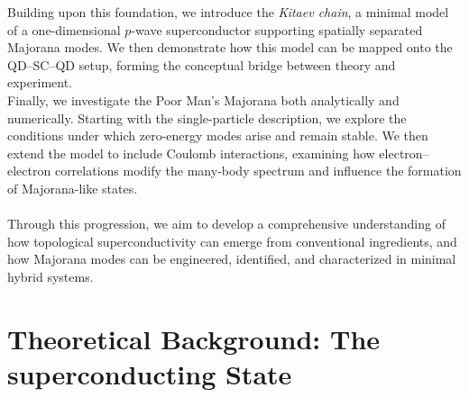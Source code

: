 \documentclass[11pt, letterpaper, titlepage]{article}
\begin{document}
Building upon this foundation, we introduce the \textit{Kitaev chain}, a minimal model of a one-dimensional $p$-wave superconductor supporting spatially separated Majorana modes. We then demonstrate how this model can be mapped onto the QD–SC–QD setup, forming the conceptual bridge between theory and experiment.  \\ 
Finally, we investigate the Poor Man’s Majorana both analytically and numerically. Starting with the single-particle description, we explore the conditions under which zero-energy modes arise and remain stable. We then extend the model to include Coulomb interactions, examining how electron–electron correlations modify the many-body spectrum and influence the formation of Majorana-like states. \\  \\ 
Through this progression, we aim to develop a comprehensive understanding of how topological superconductivity can emerge from conventional ingredients, and how Majorana modes can be engineered, identified, and characterized in minimal hybrid systems.













\section{Theoretical Background: The superconducting State}
\end{document}
